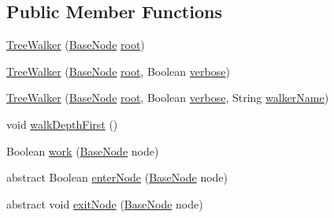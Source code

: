 \subsection*{Public Member Functions}
\begin{DoxyCompactItemize}
\item 
\hyperlink{classit_1_1emarolab_1_1cagg_1_1core_1_1BaseNode_1_1TreeWalker_adf91ddab833bba97d50bf72e15f7956e}{Tree\-Walker} (\hyperlink{classit_1_1emarolab_1_1cagg_1_1core_1_1BaseNode}{Base\-Node} \hyperlink{classit_1_1emarolab_1_1cagg_1_1core_1_1BaseNode_1_1TreeVisitor_ac31e11edac71abb866fd7d113a2bb017}{root})
\item 
\hyperlink{classit_1_1emarolab_1_1cagg_1_1core_1_1BaseNode_1_1TreeWalker_a575cbb9d8cd3eea1eb7c686ee6234ba9}{Tree\-Walker} (\hyperlink{classit_1_1emarolab_1_1cagg_1_1core_1_1BaseNode}{Base\-Node} \hyperlink{classit_1_1emarolab_1_1cagg_1_1core_1_1BaseNode_1_1TreeVisitor_ac31e11edac71abb866fd7d113a2bb017}{root}, Boolean \hyperlink{classit_1_1emarolab_1_1cagg_1_1core_1_1BaseNode_1_1TreeVisitor_a08821e56497abdbac48f874f8946b335}{verbose})
\item 
\hyperlink{classit_1_1emarolab_1_1cagg_1_1core_1_1BaseNode_1_1TreeWalker_a1454780d476b0d40ca0b2857967a1b29}{Tree\-Walker} (\hyperlink{classit_1_1emarolab_1_1cagg_1_1core_1_1BaseNode}{Base\-Node} \hyperlink{classit_1_1emarolab_1_1cagg_1_1core_1_1BaseNode_1_1TreeVisitor_ac31e11edac71abb866fd7d113a2bb017}{root}, Boolean \hyperlink{classit_1_1emarolab_1_1cagg_1_1core_1_1BaseNode_1_1TreeVisitor_a08821e56497abdbac48f874f8946b335}{verbose}, String \hyperlink{classit_1_1emarolab_1_1cagg_1_1core_1_1BaseNode_1_1TreeVisitor_aa7178eb73b988619412baf1d4f97b703}{walker\-Name})
\item 
void \hyperlink{classit_1_1emarolab_1_1cagg_1_1core_1_1BaseNode_1_1TreeWalker_a2b35dbc86137152223739d591467f123}{walk\-Depth\-First} ()
\item 
Boolean \hyperlink{classit_1_1emarolab_1_1cagg_1_1core_1_1BaseNode_1_1TreeWalker_a03c53c0db02b590b0af7b9333b854f6a}{work} (\hyperlink{classit_1_1emarolab_1_1cagg_1_1core_1_1BaseNode}{Base\-Node} node)
\item 
abstract Boolean \hyperlink{classit_1_1emarolab_1_1cagg_1_1core_1_1BaseNode_1_1TreeWalker_a5f94ea0c9f60be7cfa4cc8c5fa027064}{enter\-Node} (\hyperlink{classit_1_1emarolab_1_1cagg_1_1core_1_1BaseNode}{Base\-Node} node)
\item 
abstract void \hyperlink{classit_1_1emarolab_1_1cagg_1_1core_1_1BaseNode_1_1TreeWalker_ae37f6e493a676843d9f2ae3d90cf8798}{exit\-Node} (\hyperlink{classit_1_1emarolab_1_1cagg_1_1core_1_1BaseNode}{Base\-Node} node)
\end{DoxyCompactItemize}

